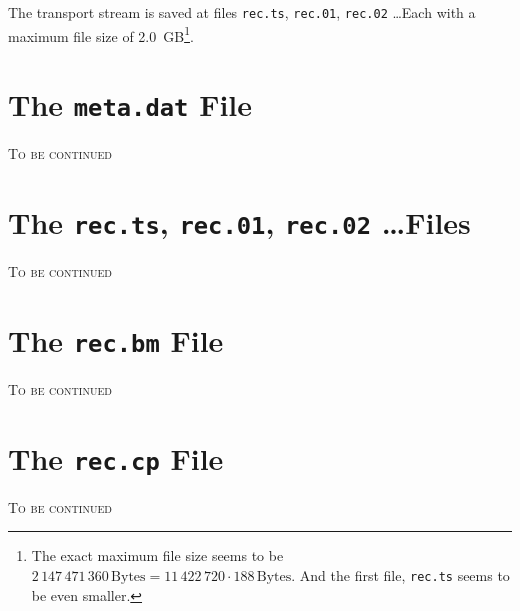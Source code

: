 \documentclass{scrartcl}
\begin{document}
The transport stream is saved at files \texttt{rec.ts}, \texttt{rec.01},
\texttt{rec.02} \dots Each with a maximum file size of 2.0~GB\footnote{The
  exact maximum file size seems to be $2\,147\,471\,360\,\textrm{Bytes} =
  11\,422\,720 \cdot 188\,\textrm{Bytes}$. And the first file, \texttt{rec.ts}
  seems to be even smaller.}.

\section{The \texttt{meta.dat} File}
\label{sec:meta.dat-file}

\textsc{To be continued}

\section{The \texttt{rec.ts}, \texttt{rec.01}, \texttt{rec.02} \dots Files}
\label{sec:rec.ts-file}

\textsc{To be continued}

\section{The \texttt{rec.bm} File}
\label{sec:rec.bm-file}

\textsc{To be continued}

\section{The \texttt{rec.cp} File}
\label{sec:rec.cp-file}

\textsc{To be continued}
\end{document}
